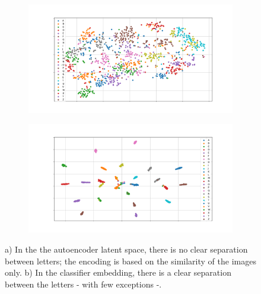 \begin{figure}
    \centering
    \begin{subfigure}[b]{0.6\textwidth}
        \includegraphics[width=\textwidth]{images/gbem/AutoEnc_Vis_tsne.png}
        \caption{}
        \label{fig:autoenc_latent}
    \end{subfigure}
    \quad
    \begin{subfigure}[b]{0.6\textwidth}
        \includegraphics[width=\textwidth]{images/gbem/Classifier_Vis_tsne.png}
        \caption{}
        \label{fig:classifier_latent}
    \end{subfigure}
    \caption{a) In the the autoencoder latent space, there is no clear separation between letters; the encoding is based on the similarity of the images only. b) In the classifier embedding, there is a clear separation between the letters - with few exceptions -.}

\end{figure}

